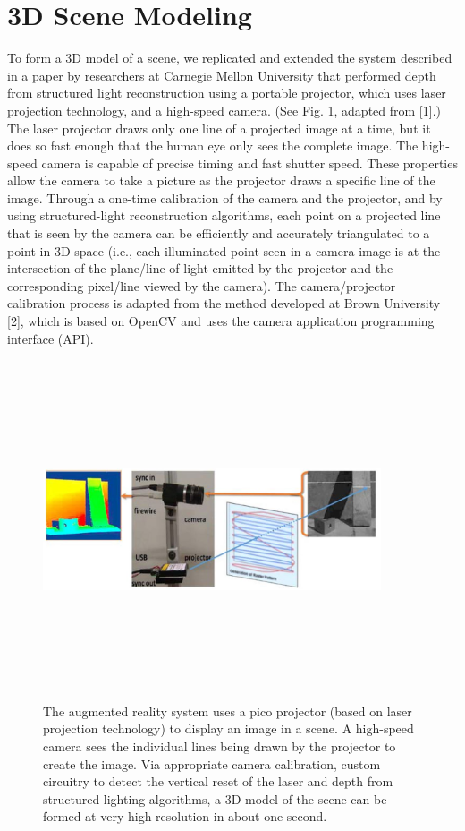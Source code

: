 \documentclass{llncs}
\begin{document}
\section{3D Scene Modeling}
To form a 3D model of a scene, we replicated and extended the system described in a paper by researchers at Carnegie Mellon University that performed depth from structured light reconstruction using a portable projector, which uses laser projection technology, and a high-speed camera. (See Fig. 1, adapted from [1].) The laser projector draws only one line of a projected image at a time, but it does so fast enough that the human eye only sees the complete image.
The high-speed camera is capable of precise timing and fast shutter speed. These properties allow the camera to take a picture as the projector draws a specific line of the image. Through a one-time calibration of the camera and the projector, and by using structured-light reconstruction algorithms, each point on a projected line that is seen by the camera can be efficiently and accurately triangulated to a point in 3D space (i.e., each illuminated point seen in a camera image is at the intersection of the plane/line of light emitted by the projector and the corresponding pixel/line viewed by the camera). The camera/projector calibration process is adapted from the method developed at Brown University [2], which is based on OpenCV and uses the camera application programming interface (API).
\begin{figure}
\centering
\includegraphics[width=10cm,height=10cm,keepaspectratio]{plan}
\caption{
The augmented reality system uses a pico projector (based on laser projection technology) to display an image in a scene. A high-speed camera sees the individual lines being drawn by the projector to create the image. Via appropriate camera calibration, custom circuitry to detect the vertical reset of the laser and depth from structured lighting algorithms, a 3D model of the scene can be formed at very high resolution in about one second.
}
\end{figure}
\end{document}
